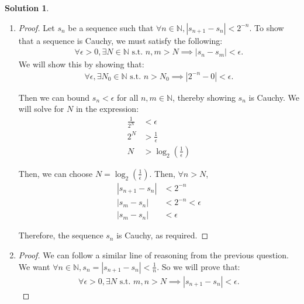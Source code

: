 \documentclass[12pt]{article}
\theoremstyle{definition} %
\newtheorem{solution}{Solution}
\theoremstyle{plain} %
\begin{document}
\begin{solution}
    \begin{enumerate}
        \item \begin{proof}
            Let $s_n$ be a sequence such that $\forall n \in \mathbb{N}, |s_{n+1} - s_n| < 2^{-n}$. To show that a sequence is Cauchy, we must satisfy the following: 
            \begin{align}
            \forall \epsilon > 0, \exists N \in \mathbb{N} \text{ s.t. } n, m > N \implies |s_n - s_m| < \epsilon.
            \end{align}
            We will show this by showing that:
            \begin{align}
            \forall \epsilon, \exists N_0 \in \mathbb{N} \text{ s.t. } n > N_0 \implies |2^{-n} - 0| < \epsilon.
            \end{align}
        
            Then we can bound $s_n < \epsilon$ for all $n, m \in \mathbb{N}$, thereby showing $s_n$ is Cauchy. We will solve for $N$ in the expression:
            \begin{align}
                \frac{1}{2^N} &< \epsilon \tag{34} \\
                2^N &> \frac{1}{\epsilon} \tag{35} \\
                N &> \log_2 \left( \frac{1}{\epsilon} \right) \tag{36}
            \end{align}
        
            Then, we can choose $N = \log_2 \left( \frac{1}{\epsilon} \right)$. Then, $\forall n > N$,
            \begin{align}
                |s_{n+1} - s_n| &< 2^{-n} \tag{37} \\
                |s_m - s_n| &< 2^{-n} < \epsilon \tag{38} \\
                |s_m - s_n| &< \epsilon \tag{39}
            \end{align}
        
            Therefore, the sequence $s_n$ is Cauchy, as required. 
        \end{proof}
        \item \begin{proof}
            We can follow a similar line of reasoning from the previous question. We want $\forall n \in \mathbb{N}, s_n = |s_{n+1} - s_n| < \frac{1}{n}$. So we will prove that:
            \begin{align}
            \forall \epsilon > 0, \exists N \text{ s.t. } m, n > N \implies |s_{n+1} - s_n| < \epsilon.
            \end{align}
        

\end{proof}
\end{enumerate}
\end{solution}
\end{document}
